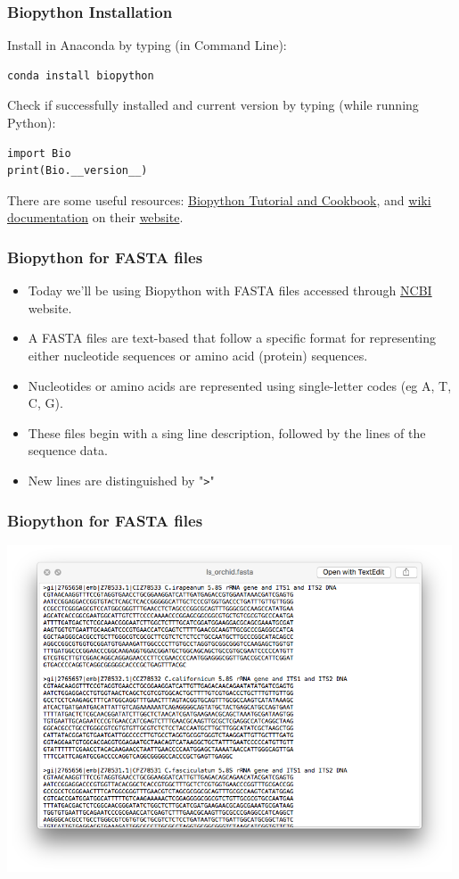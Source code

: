 \documentclass[xcolor=svgnames]{beamer}
\newcommand{\ft}[1]{\frametitle{#1}}
\begin{document}
\begin{frame}
[fragile]\ft{Biopython Installation}
Install in Anaconda by typing (in Command Line):
\begin{Verbatim}[xleftmargin=.5in] 
conda install biopython
\end{Verbatim}
Check if successfully installed and current version by typing (while running Python):
\begin{Verbatim}[xleftmargin=.5in] 
import Bio
print(Bio.__version__)
\end{Verbatim}
There are some useful resources: \href{http://biopython.org/DIST/docs/tutorial/Tutorial.html}{Biopython Tutorial and Cookbook},  and \href{https://biopython.org/wiki/Category%3AWiki_Documentation} {wiki documentation} on their \href{https://biopython.org/}{website}.
\end{frame}



\begin{frame}
[fragile]\ft{Biopython for FASTA files}
\begin{itemize}
\item Today we'll be using Biopython with FASTA files accessed through \href{https://www.ncbi.nlm.nih.gov/nuccore}{NCBI} website.
\item A FASTA files are text-based that follow a specific format for representing either nucleotide sequences or amino acid (protein) sequences.
\item Nucleotides or amino acids are represented using single-letter codes (eg A, T, C, G).
\item These files begin with a sing line description, followed by the lines of the sequence data.
\item New lines are distinguished by "\verb|>|"
\end{itemize}
\end{frame}


\begin{frame}
[fragile]\ft{Biopython for FASTA files}
\begin{center}
\includegraphics[width=0.99\textwidth]{img/fasta.png}
\end{center}
\end{frame}
\end{document}
